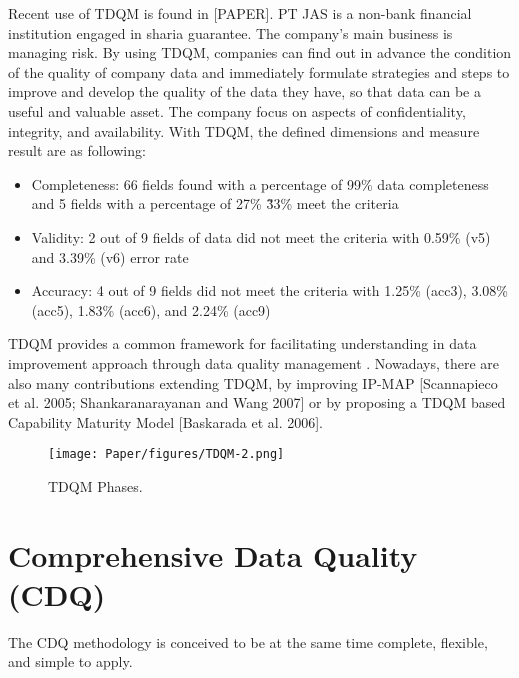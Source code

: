 \documentclass[pdftex,english,oribibl]{llncs}
\begin{document}
Recent use of TDQM is found in [PAPER]. PT JAS is a non-bank financial institution engaged in sharia guarantee. The company's main business is managing risk. By using TDQM, companies can find out in advance the condition of the quality of company data and immediately formulate strategies and steps to improve and develop the quality of the data they have, so that data can be a useful and valuable asset. The company focus on aspects of confidentiality, integrity, and availability. With TDQM, the defined dimensions and measure result are as following:
\begin{itemize}
    \item Completeness: 66 fields found with a percentage of 99\% data completeness and 5 fields with a percentage of 27\% \~ 33\% meet the criteria
    \item Validity: 2 out of 9 fields of data did not meet the criteria with 0.59\% (v5) and 3.39\% (v6) error rate
    \item Accuracy: 4 out of 9 fields did not meet the criteria with  1.25\% (acc3), 3.08\% (acc5), 1.83\% (acc6), and 2.24\% (acc9)

\end{itemize}
TDQM provides a common framework for facilitating understanding in data improvement approach through data quality management .
Nowadays, there are also many contributions extending TDQM, by improving IP-MAP [Scannapieco et al. 2005; Shankaranarayanan and Wang 2007] or by proposing a TDQM based Capability Maturity Model [Baskarada et al. 2006].


\begin{figure}
    \centering
    \texttt{[image: Paper/figures/TDQM-2.png]}
    \caption{TDQM Phases.}
    \label{fig:PhasesTDQM}
 \end{figure}


\section{Comprehensive Data Quality (CDQ)}

The CDQ methodology \cite{Batini2006DQConceptsMethodologiesTechniques} \cite{Batini2007ComprehensiveDQ} \cite{Batini2008ComprehensiveDQ} is conceived to be at the same time complete, flexible, and simple to apply.

\begin{comment}
Completeness is achieved by considering existing techniques and tools and integrating them in a framework that can work in both intra- and inter-organizational contexts, and can be applied to all types of data, structured, semistructured and unstructured.
The methodology is flexible since it supports the user in the selection of the most suitable techniques and tools within each phase and in any context.
Finally, CDQ is simple since it is organized in phases and each phase is characterized by a specific goal and set of techniques to apply.

In fact, the other methodologies implicitly assume that contextual knowledge has been previously gathered and modelled.
\end{comment}
\end{document}
